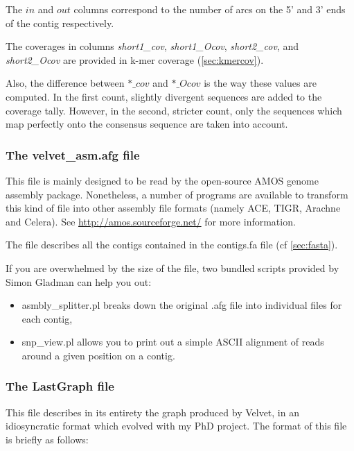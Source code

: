 \documentclass{article}
\begin{document}
The $in$ and $out$ columns correspond to the number of arcs on the 5' and 3' ends of the contig respectively.

The coverages in columns \emph{short1\_cov}, \emph{short1\_Ocov}, \emph{short2\_cov}, and \emph{short2\_Ocov} are provided in k-mer coverage (\ref{sec:kmercov}).

Also, the difference between $*\_cov$ and $*\_Ocov$ is the way these values are computed. In the first count, slightly divergent sequences are added to the coverage tally. However, in the second, stricter count, only the sequences which map perfectly onto the consensus sequence are taken into account.

\subsubsection{The velvet\_asm.afg file}

\label{sec:amos}

This file is mainly designed to be read by the open-source AMOS genome assembly package. Nonetheless, a number of programs are available to transform this kind of file into other assembly file formats (namely ACE, TIGR, Arachne and Celera). See \href{http://amos.sourceforge.net/}{http://amos.sourceforge.net/} for more information.

The file describes all the contigs contained in the contigs.fa file (cf \ref{sec:fasta}). 

If you are overwhelmed by the size of the file, two bundled scripts provided by Simon Gladman can help you out:
\begin{itemize}
\item asmbly\_splitter.pl breaks down the  original .afg file into individual files for each contig,
\item snp\_view.pl allows you to print out a simple ASCII alignment of reads around a given position on a contig.
\end{itemize}

\subsubsection{The LastGraph file}

This file describes in its entirety the graph produced by Velvet, in an idiosyncratic format which evolved with my PhD project. The format of this file is briefly as follows:
\end{document}
